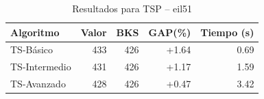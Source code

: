 \begin{table}[h]
\centering
\caption{Resultados para TSP -- eil51}
\label{tab:tsp_eil51}
\begin{tabular}{lrrrr}
\hline
\textbf{Algoritmo} & \textbf{Valor} & \textbf{BKS} & \textbf{GAP(\%)} & \textbf{Tiempo (s)} \\
\hline
TS-Básico & 433 & 426 & +1.64 & 0.69 \\
TS-Intermedio & 431 & 426 & +1.17 & 1.59 \\
TS-Avanzado & 428 & 426 & +0.47 & 3.42 \\
\hline
\end{tabular}
\end{table}
